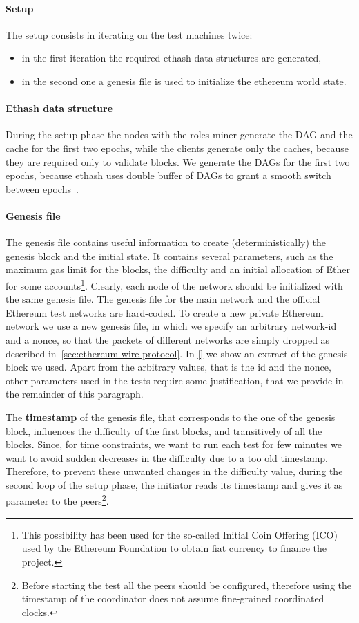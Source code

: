 \paragraph{Setup}
The setup consists in iterating on the test machines twice:
\begin{itemize}
  \item in the first iteration the required ethash data structures are generated,
  \item in the second one a genesis file is used to initialize the ethereum world
  state.
\end{itemize}


\paragraph{Ethash data structure}
During the setup phase the nodes with the roles miner generate the DAG and the
cache for the first two epochs, while the clients generate only the caches,
because they are required only to validate blocks. We generate the DAGs for the
first two epochs, because ethash uses double buffer of DAGs to grant a smooth
switch between epochs~\cite{bib:dagger-hashimoto}.


\paragraph{Genesis file}
The genesis file contains useful information to create (deterministically) the
genesis block and the initial state. It contains several parameters, such as the
maximum gas limit for the blocks, the difficulty and an initial allocation of
Ether for some accounts\footnote{This possibility has been used for the
so-called Initial Coin Offering (ICO) used by the Ethereum Foundation to obtain
fiat currency to finance the project.}. Clearly, each node of the network should
be initialized with the same genesis file. The genesis file for the main network
and the official Ethereum test networks are hard-coded. To create a new private
Ethereum network we use a new genesis file, in which we specify an arbitrary
network-id and a nonce, so that the packets of different networks are simply
dropped as described in~\autoref{sec:ethereum-wire-protocol}. In \autoref{} we
show an extract of the genesis block we used. Apart from the arbitrary values,
that is the id and the nonce, other parameters used in the tests require some
justification, that we provide in the remainder of this paragraph.

The \textbf{timestamp} of the genesis file, that corresponds to the one of the
genesis block, influences the difficulty of the first blocks, and transitively
of all the blocks. Since, for time constraints, we want to run each test for few
minutes we want to avoid sudden decreases in the difficulty due to a too old
timestamp. Therefore, to prevent these unwanted changes in the difficulty value,
during the second loop of the setup phase, the initiator reads its timestamp and
gives it as parameter to the peers\footnote{Before starting the test all the
peers should be configured, therefore using the timestamp of the coordinator
does not assume fine-grained coordinated clocks.}.

